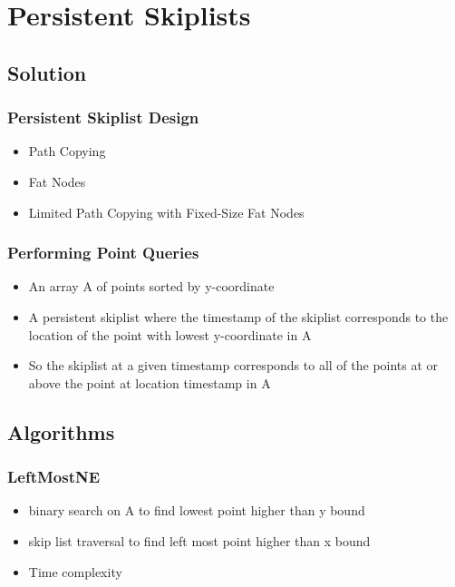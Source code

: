 \documentclass{beamer}
\begin{document}
\section{Persistent Skiplists}

\subsection{Solution}

\begin{frame}
  \frametitle{Persistent Skiplist Design}

  \begin{itemize}
  \item
    Path Copying
  \item
    Fat Nodes
  \item
    Limited Path Copying with Fixed-Size Fat Nodes
  \end{itemize}
\end{frame}

\begin{frame}
  \frametitle{Performing Point Queries}

  \begin{itemize}
  \item
    An array A of points sorted by y-coordinate
  \item
    A persistent skiplist where the timestamp of the skiplist corresponds to the
    location of the point with lowest y-coordinate in A
  \item
    So the skiplist at a given timestamp corresponds to all of the points at or
    above the point at location timestamp in A
  \end{itemize}
\end{frame}

\subsection{Algorithms}

\begin{frame}
  \frametitle{LeftMostNE}

  \begin{itemize}
  \item
    binary search on A to find lowest point higher than y bound
  \item
    skip list traversal to find left most point higher than x bound
  \item
    Time complexity
  \end{itemize}
\end{frame}
\end{document}
